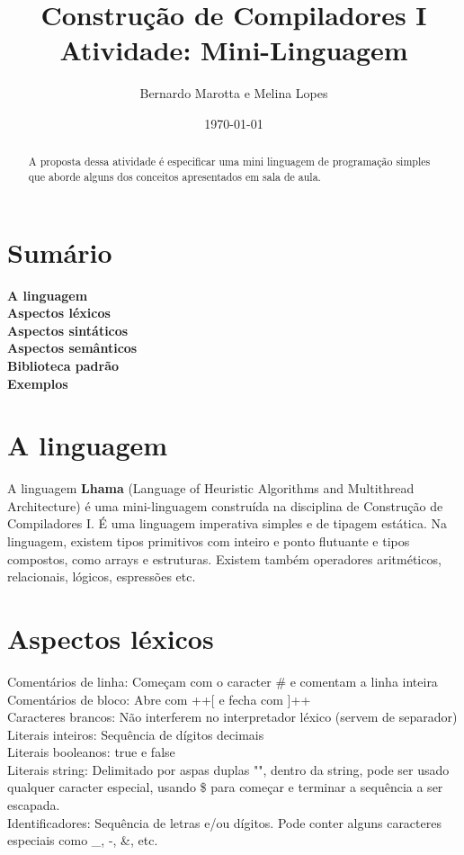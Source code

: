 \documentclass[letterpaper,12pt]{article}
\begin{document}
\title{%
  Constru\c{c}\~ao de Compiladores I\\
  \large Atividade: Mini-Linguagem}
\author{Bernardo Marotta e Melina Lopes}
\date{\today}
\maketitle

\begin{abstract}
A proposta dessa atividade \'e especificar uma mini linguagem de programa\c{c}\~ao simples que aborde alguns dos conceitos apresentados em sala de aula. 
\end{abstract}


\section{Sum\'ario}
\textbf{A linguagem}\\
\textbf{Aspectos l\'exicos}\\
\textbf{Aspectos sint\'aticos}\\
\textbf{Aspectos sem\^anticos}\\
\textbf{Biblioteca padr\~ao}\\
\textbf{Exemplos}\\


\section{A linguagem}
A linguagem \textbf{Lhama} (Language of Heuristic Algorithms and Multithread Architecture) \'e uma mini-linguagem constru\'ida na disciplina de Constru\c{c}\~ao de Compiladores I. \'E uma linguagem imperativa simples e de tipagem est\'atica. Na linguagem, existem tipos primitivos com inteiro e ponto flutuante e tipos compostos, como arrays e estruturas. Existem tamb\'em operadores aritm\'eticos, relacionais, l\'ogicos, espressões etc.

\section{Aspectos l\'exicos}
Coment\'arios de linha: Come\c{c}am com o caracter \# e comentam a linha inteira\\
Coment\'arios de bloco: Abre com ++[ e fecha com ]++\\
Caracteres brancos: N\~ao interferem no interpretador l\'exico (servem de separador)\\
Literais inteiros: Sequ\^encia de d\'igitos decimais\\
Literais booleanos: true e false\\	
Literais string: Delimitado por aspas duplas "", dentro da string, pode ser usado qualquer caracter especial, usando \$ para come\c{c}ar e terminar a sequ\^encia a ser escapada.\\
Identificadores: Sequ\^encia de letras e/ou d\'igitos. Pode conter alguns caracteres especiais como \_, -, \&, etc. 
\end{document}
